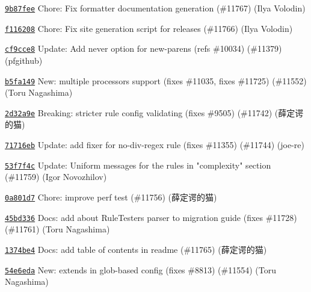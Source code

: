 \begin{DoxyItemize}
\item \href{https://github.com/eslint/eslint/commit/9b87fee9dc7b1d99a50b924cb6b81255ebb5c4a2}{\texttt{ {\ttfamily 9b87fee}}} Chore\+: Fix formatter documentation generation (\#11767) (Ilya Volodin)
\item \href{https://github.com/eslint/eslint/commit/f11620848733a3a6f58811d9bb2c3e748d6135ac}{\texttt{ {\ttfamily f116208}}} Chore\+: Fix site generation script for releases (\#11766) (Ilya Volodin)
\item \href{https://github.com/eslint/eslint/commit/cf9cce81aa68e9bc23840530cb33f4c3f551fb1e}{\texttt{ {\ttfamily cf9cce8}}} Update\+: Add never option for new-\/parens (refs \#10034) (\#11379) (pfgithub)
\item \href{https://github.com/eslint/eslint/commit/b5fa1491d2371a721e4b5029e797ae98fd30fed2}{\texttt{ {\ttfamily b5fa149}}} New\+: multiple processors support (fixes \#11035, fixes \#11725) (\#11552) (Toru Nagashima)
\item \href{https://github.com/eslint/eslint/commit/2d32a9e8dd10a5927576bd50d184876c775da4af}{\texttt{ {\ttfamily 2d32a9e}}} Breaking\+: stricter rule config validating (fixes \#9505) (\#11742) (薛定谔的猫)
\item \href{https://github.com/eslint/eslint/commit/71716eba3155266d777b994a38af524952e97696}{\texttt{ {\ttfamily 71716eb}}} Update\+: add fixer for no-\/div-\/regex rule (fixes \#11355) (\#11744) (joe-\/re)
\item \href{https://github.com/eslint/eslint/commit/53f7f4cf8d8b66a1911db56e4f72764388a21cc4}{\texttt{ {\ttfamily 53f7f4c}}} Update\+: Uniform messages for the rules in "{}complexity"{} section (\#11759) (Igor Novozhilov)
\item \href{https://github.com/eslint/eslint/commit/0a801d702dc41dae7eac0c802b822493ddc3ac41}{\texttt{ {\ttfamily 0a801d7}}} Chore\+: improve perf test (\#11756) (薛定谔的猫)
\item \href{https://github.com/eslint/eslint/commit/45bd336e647a6fa8a502488e5cbd27ba02712083}{\texttt{ {\ttfamily 45bd336}}} Docs\+: add about Rule\+Tester\textquotesingle{}s parser to migration guide (fixes \#11728) (\#11761) (Toru Nagashima)
\item \href{https://github.com/eslint/eslint/commit/1374be44f7ec4b8c913c52cc84debc4012c4f3ea}{\texttt{ {\ttfamily 1374be4}}} Docs\+: add table of contents in readme (\#11765) (薛定谔的猫)
\item \href{https://github.com/eslint/eslint/commit/54e6edaa2f881aab530fa14e63d92e5e0e2ca55c}{\texttt{ {\ttfamily 54e6eda}}} New\+: extends in glob-\/based config (fixes \#8813) (\#11554) (Toru Nagashima)

\end{DoxyItemize}
